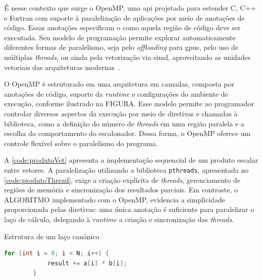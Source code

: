 É nesse contexto que surge o OpenMP, uma \gls{api} projetada para estender C, C++ e Fortran com suporte à paralelização de aplicações por meio de anotações de código. Essas anotações especificam o como aquela região de código deve ser executada. Seu modelo de programação permite explorar automaticamente diferentes formas de paralelismo, seja pelo \textit{offloading} para \glspl{gpu}, pelo uso de múltiplas \textit{threads}, ou ainda pela vetorização via \gls{simd}, aproveitando as unidades vetoriais das arquiteturas modernas~\cite{mattson2019}.

O OpenMP é estruturado em uma arquitetura em camadas, composta por anotações de código, suporte da \textit{runtime} e configurações do ambiente de execução, conforme ilustrado na FIGURA. Esse modelo permite ao programador controlar diversos aspectos da execução por meio de diretivas e chamadas à biblioteca, como a definição do número de \textit{threads} em uma região paralela e a escolha do comportamento do escalonador. Dessa forma, o OpenMP oferece um controle flexível sobre o paralelismo do programa.

A \autoref{code:produtoVet} apresenta a implementação sequencial de um produto escalar entre vetores. A paralelização utilizando a biblioteca \texttt{pthreads}, apresentada no \autoref{code:produtoThread}, exige a criação explícita de \textit{threads}, gerenciamento de regiões de memória e sincronização dos resultados parciais. Em contraste, o ALGORITMO implementado com o OpenMP, evidencia a simplicidade proporcionada pelas diretivas: uma única anotação é suficiente para paralelizar o laço de cálculo, delegando à \textit{runtime} a criação e sincronização das \textit{threads}.

\begin{sourcecode}[htb]\caption{\label{code:produtoVet}Estrutura de um laço canônico}
    \begin{lstlisting}[frame=single, language=C++]
        for (int i = 0; i < N; i++) {
            result += a[i] * b[i];
        }
    \end{lstlisting}
    \fonte{}
\end{sourcecode}

